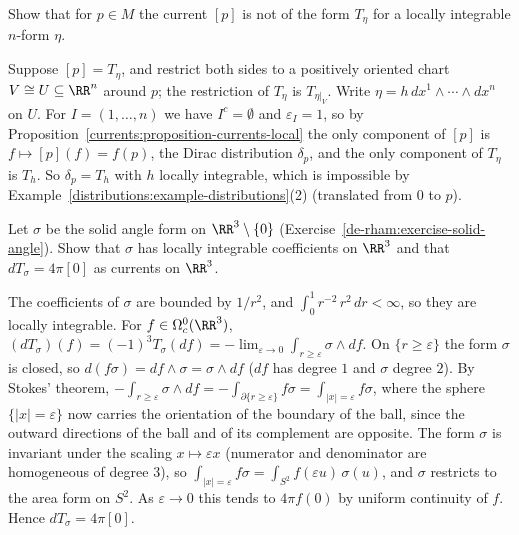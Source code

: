 \begin{exercise}\label{currents:exercise-dirac-current}
Show that for $p \in M$ the current $[p]$ is not of the form $T_\eta$ for a locally integrable $n$-form $\eta$.
\end{exercise}

\begin{solution}
Suppose $[p] = T_\eta$, and restrict both sides to a positively oriented chart $V \cong U \subseteq \RR^n$ around $p$; the restriction of $T_\eta$ is $T_{\eta|_V}$. Write $\eta = h\,dx^1 \wedge \cdots \wedge dx^n$
on $U$. For $I = (1, \ldots, n)$ we have $I^c = \emptyset$ and $\varepsilon_I = 1$, so by Proposition~\ref{currents:proposition-currents-local} the only component of $[p]$ is $f \mapsto [p](f) = f(p)$, the Dirac
distribution $\delta_p$, and the only component of $T_\eta$ is $T_h$. So $\delta_p = T_h$ with $h$ locally integrable, which is impossible by
Example~\ref{distributions:example-distributions}(2) (translated from $0$ to $p$).
\end{solution}

\begin{exercise}\label{currents:exercise-solid-angle-current}
Let $\sigma$ be the solid angle form on $\RR^3 \setminus \{0\}$ (Exercise~\ref{de-rham:exercise-solid-angle}). Show that $\sigma$ has locally integrable coefficients on $\RR^3$ and that
$dT_\sigma = 4\pi[0]$ as currents on $\RR^3$.
\end{exercise}

\begin{solution}
The coefficients of $\sigma$ are bounded by $1/r^2$, and $\int_0^1r^{-2}\,r^2\,dr < \infty$, so they are locally integrable. For $f \in \Omega^0_c(\RR^3)$, $(dT_\sigma)(f) = (-1)^3T_\sigma(df) = -\lim_{\varepsilon \to 0}\int_{r \geq \varepsilon}\sigma \wedge df$.
On $\{r \geq \varepsilon\}$ the form $\sigma$ is closed, so $d(f\sigma) = df \wedge \sigma = \sigma \wedge df$ ($df$ has degree $1$ and $\sigma$ degree $2$). By Stokes' theorem,
$-\int_{r \geq \varepsilon}\sigma \wedge df = -\int_{\partial\{r \geq \varepsilon\}}f\sigma = \int_{|x| = \varepsilon}f\sigma$, where the sphere $\{|x| = \varepsilon\}$ now carries the orientation of the boundary of the ball,
since the outward directions of the ball and of its complement are opposite. The form $\sigma$ is invariant under the scaling $x \mapsto \varepsilon x$ (numerator and denominator are homogeneous of degree $3$),
so $\int_{|x| = \varepsilon}f\sigma = \int_{S^2}f(\varepsilon u)\,\sigma(u)$, and $\sigma$ restricts to the area form on $S^2$. As $\varepsilon \to 0$ this tends to $4\pi f(0)$ by uniform continuity of $f$.
Hence $dT_\sigma = 4\pi[0]$.
\end{solution}

